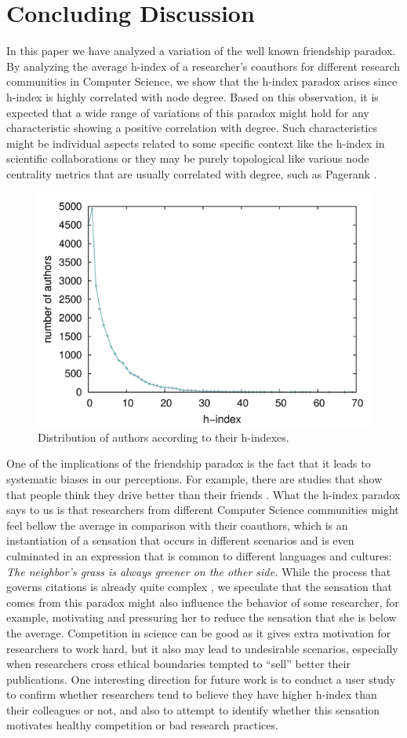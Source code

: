 \documentclass[letterpaper]{article}
\begin{document}
\section{Concluding Discussion}

In this paper we have analyzed a variation of the well known friendship paradox. By analyzing the average h-index of a researcher's coauthors for different research communities in Computer Science, we show that the h-index paradox arises since h-index is highly correlated with node degree. Based on this observation, it is expected that a wide range of variations of this paradox might hold for any characteristic showing a positive correlation with degree. Such characteristics might be individual aspects related to some specific context like the h-index in scientific collaborations or they may be purely topological like various node centrality metrics that are usually correlated with degree, such as Pagerank \cite{page1999pagerank}.


\begin{figure}[!htpb]
  \centering
  \includegraphics[width=.5\textwidth]{figures/fig2.png}
  \caption{Distribution of authors according to their h-indexes.}
  \label{fig:distrib}
\end{figure}


One of the implications of the friendship paradox is the fact that it leads to systematic biases in our perceptions. For example, there are studies that show that people think they drive better than their friends \cite{mckenna1991factors}. What the h-index paradox says to us is that researchers from different Computer Science communities might feel bellow the average in comparison with their coauthors, which is an instantiation of a sensation that occurs in different scenarios and is even culminated in an expression that is common to different languages and cultures: \textit{The neighbor’s grass is always greener on the other side.} While the process that governs citations is already quite complex \cite{barabasi1999emergence} \cite{onze}, we speculate that the sensation that comes from this paradox might also influence the behavior of some researcher, for example, motivating and pressuring her to reduce the sensation that she is below the average. Competition in science can be good as it gives extra motivation for researchers to work hard, but it also may lead to undesirable scenarios, especially when researchers cross ethical boundaries tempted to ``sell'' better their publications. One interesting direction for future work is to conduct a user study to confirm whether researchers tend to believe they have higher h-index than their colleagues or not, and also to attempt to identify whether this sensation motivates healthy competition or bad research practices.
\end{document}
